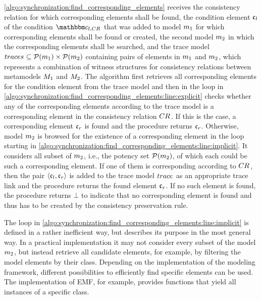 \autoref{algo:synchronization:find_corresponding_elements} receives the consistency relation for which corresponding elements shall be found, the condition element $\conditionelement{c}{l}$ of the condition $\condition{c}{l,\consistencyrelation{CR}{}}$ that was added to model $\model{m}{1}$ for which corresponding elements shall be found or created, the second model $\model{m}{2}$ in which the corresponding elements shall be searched, and the trace model $\model{traces}{} \subseteq \mathcal{P}(\model{m}{1}) \times \mathcal{P}(\model{m}{2})$ containing pairs of elements in $\model{m}{1}$ and $\model{m}{2}$, which represents a combination of witness structures for consistency relations between metamodels $\metamodel{M}{1}$ and $\metamodel{M}{2}$. 
The algorithm first retrieves all corresponding elements for the condition element from the trace model and then in the loop in \autoref{algo:synchronization:find_corresponding_elements:line:explicit} checks whether any of the corresponding elements according to the trace model is a corresponding element in the consistency relation $\consistencyrelation{CR}{}$.
If this is the case, a corresponding element $\conditionelement{c}{r}$ is found and the procedure returns $\conditionelement{c}{r}$.
Otherwise, model $\model{m}{2}$ is browsed for the existence of a corresponding element in the loop starting in \autoref{algo:synchronization:find_corresponding_elements:line:implicit}.
It considers all subset of $\model{m}{2}$, i.e., the potency set $\mathcal{P}(\model{m}{2})$, of which each could be such a corresponding element.
If one of them is corresponding according to $\consistencyrelation{CR}{}$, then the pair $\tupled{\conditionelement{c}{l},\conditionelement{c}{r}}$ is added to the trace model $\model{trace}{}$ as an appropriate trace link and the procedure returns the found element $\conditionelement{c}{r}$.
If no such element is found, the procedure returns $\bot$ to indicate that no corresponding element is found and thus has to be created by the consistency preservation rule.

The loop in \autoref{algo:synchronization:find_corresponding_elements:line:implicit} is defined in a rather inefficient way, but describes its purpose in the most general way.
In a practical implementation it may not consider every subset of the model $\model{m}{2}$, but instead retrieve all candidate elements, for example, by filtering the model elements by their class.
Depending on the implementation of the modeling framework, different possibilities to efficiently find specific elements can be used.
The implementation of \gls{EMF}, for example, provides functions that yield all instances of a specific class.

